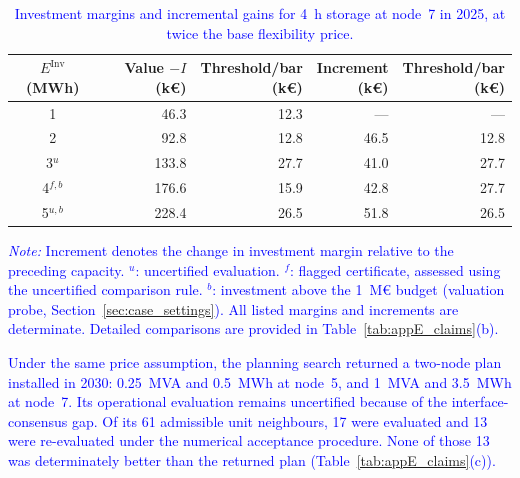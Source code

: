 \documentclass[preprint,12pt]{elsarticle}
\begin{document}
\begin{table}[htbp!]
    \centering
    \caption{\textcolor{blue}{Investment margins and incremental gains for 4~h storage at node~7 in 2025, at twice the base flexibility price.}}
    \label{tab:res_energy_ladder_m2}
    \footnotesize
    \setlength{\tabcolsep}{4pt}
    \begin{tabular}{c r r r r}
        \toprule
        \shortstack{$E^{\text{Inv}}$\\(MWh)}
        & \shortstack{Value $- I$\\(k\euro{})}
        & \shortstack{Threshold/bar\\(k\euro{})}
        & \shortstack{Increment\\(k\euro{})}
        & \shortstack{Threshold/bar\\(k\euro{})} \\
        \midrule
        1       & 46.3  & 12.3 & ---  & ---  \\
        2       & 92.8  & 12.8 & 46.5 & 12.8 \\
        3$^{u}$ & 133.8 & 27.7 & 41.0 & 27.7 \\
        4$^{f,b}$ & 176.6 & 15.9 & 42.8 & 27.7 \\
        5$^{u,b}$ & 228.4 & 26.5 & 51.8 & 26.5 \\
        \bottomrule
    \end{tabular}
    \par\smallskip
    \begin{minipage}{\linewidth}
        \footnotesize\raggedright
        \textcolor{blue}{\textit{Note:}
        Increment denotes the change in investment margin
        relative to the preceding capacity.
        $^{u}$: uncertified evaluation.
        $^{f}$: flagged certificate, assessed using the
        uncertified comparison rule.
        $^{b}$: investment above the 1~M\euro{} budget (valuation probe, Section~\ref{sec:case_settings}).
        All listed margins and increments are determinate.
        Detailed comparisons are provided in
        Table~\ref{tab:appE_claims}(b).}
    \end{minipage}
\end{table}

\textcolor{blue}{
    Under the same price assumption, the planning search returned a two-node plan installed in 2030: 0.25~MVA and 0.5~MWh at node~5, and 1~MVA and 3.5~MWh at node~7. Its operational evaluation remains uncertified because of the interface-consensus gap. Of its 61 admissible unit neighbours, 17 were evaluated and 13 were re-evaluated under the numerical acceptance procedure. None of those 13 was determinately better than the returned plan (Table~\ref{tab:appE_claims}(c)).
}
\end{document}
